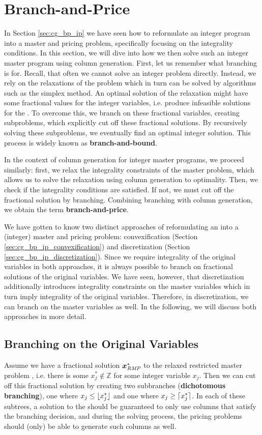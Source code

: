 \section{Branch-and-Price}\label{sec:cg_bp_bp}
In Section \ref{sec:cg_bp_ip} we have seen how to reformulate an integer program into a master and pricing problem, specifically focusing on the integrality conditions. In this section, we will dive into how we then solve such an integer master program using column generation. First, let us remember what branching is for. Recall, that often we cannot solve an integer problem directly. Instead, we rely on the \LP{} relaxations of the problem which in turn can be solved by algorithms such as the simplex method. An optimal solution of the \LP{} relaxation might have some fractional values for the integer variables, i.e. produce infeasible solutions for the \IP{}. To overcome this, we branch on these fractional variables, creating subproblems, which explicitly cut off these fractional solutions. By recursively solving these subproblems, we eventually find an optimal integer solution. This process is widely known as \textbf{branch-and-bound}.

In the context of column generation for integer master programs, we proceed similarly: first, we relax the integrality constraints of the master problem, which allows us to solve the relaxation using column generation to optimality. Then, we check if the integrality conditions are satisfied. If not, we must cut off the fractional solution by branching. Combining branching with column generation, we obtain the term \textbf{branch-and-price}.

We have gotten to know two distinct approaches of reformulating an \IP{} into a (integer) master and pricing problem: convexification (Section \ref{sec:cg_bp_ip_convexification}) and discretization (Section \ref{sec:cg_bp_ip_discretization}). Since we require integrality of the original variables in both approaches, it is always possible to branch on fractional solutions of the original variables. We have seen, however, that discretization additionally introduces integrality constraints on the master variables which in turn imply integrality of the original variables. Therefore, in discretization, we can branch on the master variables as well. In the following, we will discuss both approaches in more detail.

\subsection{Branching on the Original Variables}\label{sec:cg_bp_bp_branching_original}
Assume we have a fractional solution ${\bm{x}}^*_{\textit{RMP}}{}$ to the relaxed restricted master problem \RMP{}, i.e. there is some $x_j^* \not\in \mathbb{Z}$ for some integer variable $x_j$. Then we can cut off this fractional solution by creating two subbranches (\textbf{dichotomous branching}), one where $x_j \leq \lfloor x_j^*\rfloor$ and one where $x_j \geq \lceil x_j^*\rceil$. In each of these subtrees, a solution to the \RMP{} should be guaranteed to only use columns that satisfy the branching decision, and during the solving process, the pricing problems should (only) be able to generate such columns as well.


